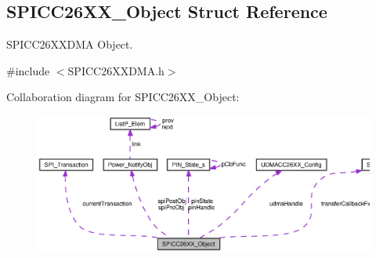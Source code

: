 \subsection{S\+P\+I\+C\+C26\+X\+X\+\_\+\+Object Struct Reference}
\label{struct_s_p_i_c_c26_x_x___object}


S\+P\+I\+C\+C26\+X\+X\+D\+M\+A Object.  




{\ttfamily \#include $<$S\+P\+I\+C\+C26\+X\+X\+D\+M\+A.\+h$>$}



Collaboration diagram for S\+P\+I\+C\+C26\+X\+X\+\_\+\+Object\+:
\nopagebreak
\begin{figure}[H]
\begin{center}
\leavevmode
\includegraphics[width=350pt]{struct_s_p_i_c_c26_x_x___object__coll__graph}
\end{center}
\end{figure}
